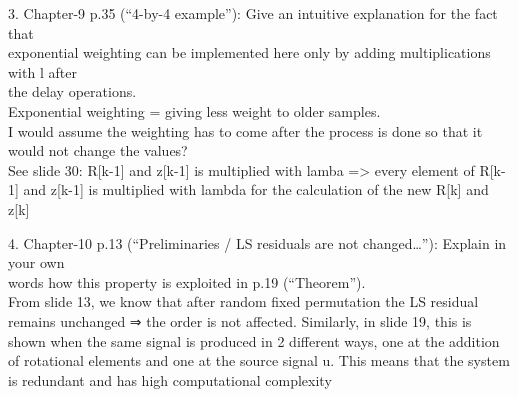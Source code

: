 \documentclass[
  a4paper,
  ,captions=tableheading
]{scrartcl}
\begin{document}
3. Chapter-9 p.35 (``4-by-4 example''): Give an intuitive explanation
for the fact that\\
exponential weighting can be implemented here only by adding
multiplications with l after\\
the delay operations.\\
Exponential weighting = giving less weight to older samples.\\
I would assume the weighting has to come after the process is done so
that it would not change the values?\\
See slide 30: R{[}k-1{]} and z{[}k-1{]} is multiplied with lamba
=\textgreater{} every element of R{[}k-1{]} and z{[}k-1{]} is multiplied
with lambda for the calculation of the new R{[}k{]} and z{[}k{]}

4. Chapter-10 p.13 (``Preliminaries / LS residuals are not
changed\ldots{}''): Explain in your own\\
words how this property is exploited in p.19 (``Theorem'').\\
From slide 13, we know that after random fixed permutation the LS
residual remains unchanged ⇒ the order is not affected. Similarly, in
slide 19, this is shown when the same signal is produced in 2 different
ways, one at the addition of rotational elements and one at the source
signal u. This means that the system is redundant and has high
computational complexity
\end{document}
